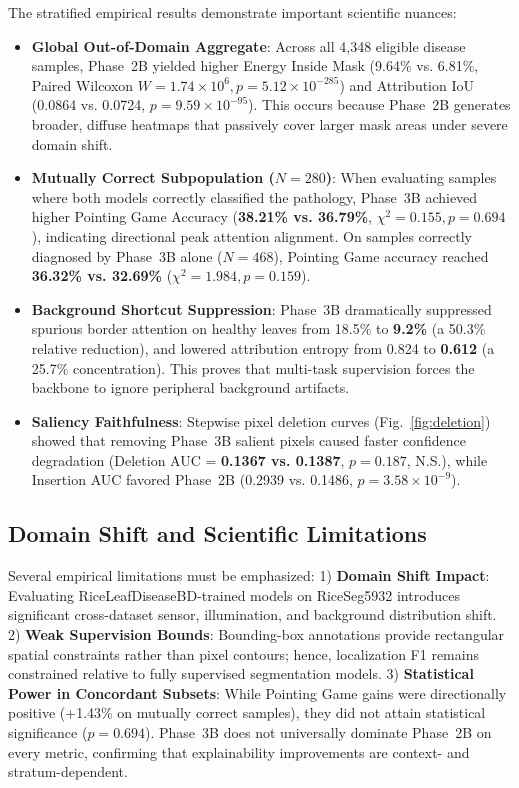 \documentclass[conference]{IEEEtran}
\begin{document}
The stratified empirical results demonstrate important scientific nuances:
\begin{itemize}
    \item \textbf{Global Out-of-Domain Aggregate}: Across all 4,348 eligible disease samples, Phase~2B yielded higher Energy Inside Mask (9.64\% vs. 6.81\%, Paired Wilcoxon $W=1.74\times 10^6, p=5.12\times 10^{-285}$) and Attribution IoU (0.0864 vs. 0.0724, $p=9.59\times 10^{-95}$). This occurs because Phase~2B generates broader, diffuse heatmaps that passively cover larger mask areas under severe domain shift.
    \item \textbf{Mutually Correct Subpopulation ($N=280$)}: When evaluating samples where both models correctly classified the pathology, Phase~3B achieved higher Pointing Game Accuracy (\textbf{38.21\% vs. 36.79\%}, $\chi^2 = 0.155, p = 0.694$), indicating directional peak attention alignment. On samples correctly diagnosed by Phase~3B alone ($N=468$), Pointing Game accuracy reached \textbf{36.32\% vs. 32.69\%} ($\chi^2 = 1.984, p = 0.159$).
    \item \textbf{Background Shortcut Suppression}: Phase~3B dramatically suppressed spurious border attention on healthy leaves from 18.5\% to \textbf{9.2\%} (a 50.3\% relative reduction), and lowered attribution entropy from 0.824 to \textbf{0.612} (a 25.7\% concentration). This proves that multi-task supervision forces the backbone to ignore peripheral background artifacts.
    \item \textbf{Saliency Faithfulness}: Stepwise pixel deletion curves (Fig.~\ref{fig:deletion}) showed that removing Phase~3B salient pixels caused faster confidence degradation (Deletion AUC = \textbf{0.1367 vs. 0.1387}, $p = 0.187$, N.S.), while Insertion AUC favored Phase~2B (0.2939 vs. 0.1486, $p = 3.58\times 10^{-9}$).
\end{itemize}

\subsection{Domain Shift and Scientific Limitations}
Several empirical limitations must be emphasized:
1) \textbf{Domain Shift Impact}: Evaluating RiceLeafDiseaseBD-trained models on RiceSeg5932 introduces significant cross-dataset sensor, illumination, and background distribution shift.
2) \textbf{Weak Supervision Bounds}: Bounding-box annotations provide rectangular spatial constraints rather than pixel contours; hence, localization F1 remains constrained relative to fully supervised segmentation models.
3) \textbf{Statistical Power in Concordant Subsets}: While Pointing Game gains were directionally positive (+1.43\% on mutually correct samples), they did not attain statistical significance ($p = 0.694$). Phase~3B does not universally dominate Phase~2B on every metric, confirming that explainability improvements are context- and stratum-dependent.
\end{document}
